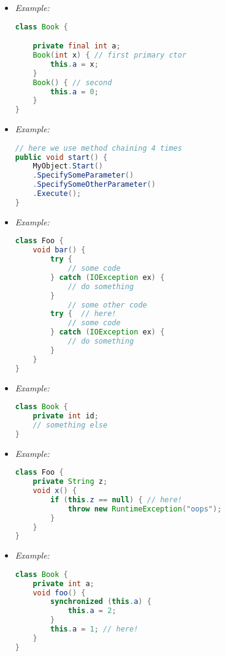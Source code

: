 \begin{itemize}
	\item {}
	{\it Example:}
\begin{lstlisting}[language=Java]
class Book {

	private final int a;
	Book(int x) { // first primary ctor
		this.a = x;
	}
	Book() { // second
		this.a = 0;
	}
}
\end{lstlisting}

	\item {}
{\it Example:}
\begin{lstlisting}[language=Java]
// here we use method chaining 4 times
public void start() {
	MyObject.Start()
	.SpecifySomeParameter()
	.SpecifySomeOtherParameter()
	.Execute();
}
\end{lstlisting}

	\item {}
{\it Example:}
\begin{lstlisting}[language=Java]
class Foo {
	void bar() {
		try {
			// some code
		} catch (IOException ex) {
			// do something
		}
			// some other code
		try {  // here!
			// some code
		} catch (IOException ex) {
			// do something
		}
	}
}
\end{lstlisting}

	\item {}
{\it Example:}
\begin{lstlisting}[language=Java]
class Book {
	private int id;
	// something else
}
\end{lstlisting}

	\item {}
{\it Example:}
\begin{lstlisting}[language=Java]
class Foo {
	private String z;
	void x() {
		if (this.z == null) { // here!
			throw new RuntimeException("oops");
		}
	}
}
\end{lstlisting}

	\item {}
{\it Example:}
\begin{lstlisting}[language=Java]
class Book {
	private int a;
	void foo() {
		synchronized (this.a) {
			this.a = 2;
		}
		this.a = 1; // here!
	}
}
\end{lstlisting}


\end{itemize}
